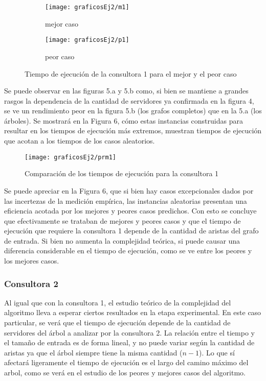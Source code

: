 \documentclass[A4paper,oneside,fleqn,11pt]{article}
\theoremstyle{definition}
\begin{document}
\begin{figure}[H] %
    \begin{subfigure}[b]{0.45\textwidth}
        \texttt{[image: graficosEj2/m1]}
        \caption[center]{mejor caso}
        \label{ni se pa que sirve esto}
    \end{subfigure}
    \begin{subfigure}[b]{0.45\textwidth}
        \texttt{[image: graficosEj2/p1]}
        \caption{peor caso}
        \label{ni se pa que sirve esto}
    \end{subfigure}
    \caption{Tiempo de ejecución de la consultora 1 para el mejor y el peor caso}
\end{figure}

Se puede observar en las figuras 5.a y 5.b como, si bien se mantiene a grandes rasgos la dependencia de la cantidad de servidores ya confirmada en la figura 4, se ve un rendimiento peor en la figura 5.b (los grafos completos) que en la 5.a (los árboles). Se mostrará en la Figura 6, cómo estas instancias construidas para resultar en los tiempos de ejecución más extremos, muestran tiempos de ejecución que acotan a los tiempos de los casos aleatorios.

\begin{figure}[H] %
    \texttt{[image: graficosEj2/prm1]}
    \label{ni se pa que sirve esto}
    \caption{Comparación de los tiempos de ejecución para la consultora 1}
\end{figure}

Se puede apreciar en la Figura 6, que si bien hay casos excepcionales dados por las incertezas de la medición empírica, las instancias aleatorias presentan una eficiencia acotada por los mejores y peores casos predichos. Con esto se concluye que efectivamente se trataban de mejores y peores casos y que el tiempo de ejecución que requiere la consultora 1 depende de la cantidad de aristas del grafo de entrada. Si bien no aumenta la complejidad teórica, si puede causar una diferencia considerable en el tiempo de ejecución, como se ve entre los peores y los mejores casos.

\subsubsection{Consultora 2}

Al igual que con la consultora 1, el estudio teórico de la complejidad del algoritmo lleva a esperar ciertos resultados en la etapa experimental. En este caso particular, se verá que el tiempo de ejecución depende de la cantidad de servidores del árbol a analizar por la consultora 2. La relación entre el tiempo y el tamaño de entrada es de forma lineal, y no puede variar según la cantidad de aristas ya que el árbol siempre tiene la misma cantidad ($n-1$). Lo que sí afectará ligeramente el tiempo de ejecución es el largo del camino máximo del arbol, como se verá en el estudio de los peores y mejores casos del algoritmo.
\end{document}
